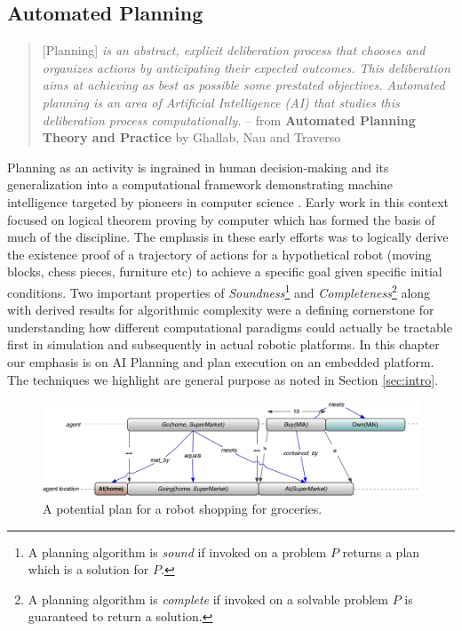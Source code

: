 \subsection{Automated Planning}
\label{sec:planningfound}

{\scriptsize
  \begin{quote} [Planning] \emph{is an abstract, explicit deliberation
      process that chooses and organizes actions by anticipating their
      expected outcomes. This deliberation aims at achieving as best
      as possible some prestated objectives. Automated planning is an
      area of Artificial Intelligence (AI) that studies this
      deliberation process computationally.} -- from \textbf{Automated
      Planning Theory and Practice} by Ghallab, Nau and Traverso
    \cite{ghallab04}
\end{quote}
}

Planning as an activity is ingrained in human decision-making
\cite{berthoz} and its generalization into a computational framework
demonstrating machine intelligence 
targeted by pioneers in computer science
\cite{computersthought}. Early work in this context focused on logical
theorem proving by computer \cite{green69} which has formed the basis
of much of the discipline. The emphasis in these early efforts was to
logically derive the existence proof of a trajectory of actions for a
hypothetical robot (moving blocks, chess pieces, furniture etc) to
achieve a specific goal given specific initial conditions. Two
important properties of \emph{Soundness}\footnote{A planning algorithm
  is \emph{sound} if invoked on a problem $P$ returns a plan which is
  a solution for $P$.} and \emph{Completeness}\footnote{A planning
  algorithm is \emph{complete} if invoked on a solvable problem $P$ is
  guaranteed to return a solution.} along with derived results for
algorithmic complexity \cite{gareyjohnson,corman} were a defining
cornerstone for understanding how different computational paradigms
could actually be tractable first in simulation and subsequently in
actual robotic platforms. In this chapter our emphasis is on AI
Planning and plan execution on an embedded 
platform. The techniques we highlight are general purpose as noted in
Section \ref{sec:intro}.

\begin{figure}[!t]
\centering
  \includegraphics[scale=3]{figs/shopping_europa.jpeg}
  \caption{\small A potential plan for a robot shopping for groceries.}
\label{fig:shop:shopping}
\end{figure}

